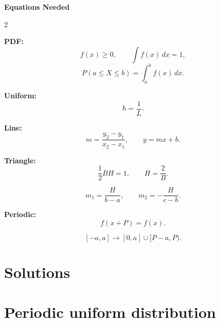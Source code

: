 	
	\vspace{1mm}
	
	\begin{center}
		{\large\bfseries Equations Needed}
	\end{center}
	
	\vspace{-3mm}
	
	\setlength{\columnseprule}{0.4pt}
	\begin{multicols}{2}
		
		\textbf{PDF:}
		\[
		f(x)\ge0,
		\qquad
		\int f(x)\,dx=1,
		\] \[
		P(a\le X\le b)=\int_a^b f(x)\,dx.
		\]
		
		\textbf{Uniform:}
		\[
		h=\frac1L.
		\]
		
		\textbf{Line:}
		\[
		m=\frac{y_2-y_1}{x_2-x_1},
		\qquad
		y=mx+b.
		\]
		
		\columnbreak
		
		\textbf{Triangle:}
		\[
		\frac12BH=1,
		\qquad
		H=\frac2B.
		\]
		
		\[
		m_1=\frac{H}{b-a},
		\qquad
		m_2=-\frac{H}{c-b}.
		\]
		
		\textbf{Periodic:}
		\[
		f(x+P)=f(x).
		\]
		
		\[
		[-a,a]\rightarrow[0,a]\cup[P-a,P).
		\]
		
	\end{multicols}
	
	\setlength{\columnseprule}{0pt}
	
	
	\newpage
	\restoregeometry
	
	\vspace*{-15mm}
	
	\section*{Solutions}
	
	
	\section{Periodic uniform distribution}
	
